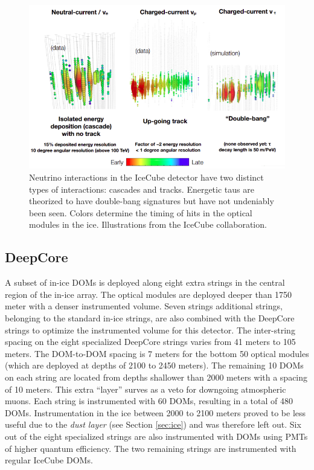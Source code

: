 \begin{figure}
\centering
\includegraphics[width=\textwidth]{chapter4/img/ICinteractions2.png}
\caption{Neutrino interactions in the IceCube detector have two distinct types of interactions: cascades and tracks. Energetic taus are theorized to have double-bang signatures but have not undeniably been seen. Colors determine the timing of hits in the optical modules in the ice. Illustrations from the IceCube collaboration.}
\label{fig:ICinteractions2}
\end{figure}
 
\subsection{DeepCore}
A subset of in-ice DOMs is deployed along eight extra strings in the central region of the in-ice array. The optical modules are deployed deeper than 1750 meter with a denser instrumented volume. Seven strings additional strings, belonging to the standard in-ice strings, are also combined with the DeepCore strings to optimize the instrumented volume for this detector. The inter-string spacing on the eight specialized DeepCore strings varies from 41 meters to 105 meters. The DOM-to-DOM spacing is 7 meters for the bottom 50 optical modules (which are deployed at depths of 2100 to 2450 meters). The remaining 10 DOMs on each string are located from depths shallower than 2000 meters with a spacing of 10 meters. This extra ``layer'' surves as a veto for downgoing atmospheric muons. Each string is instrumented with 60 DOMs, resulting in a total of 480 DOMs. Instrumentation in the ice between 2000 to 2100 meters proved to be less useful due to the \textit{dust layer} (see Section \ref{sec:ice}) and was therefore left out. Six out of the eight specialized strings are also instrumented with DOMs using PMTs of higher quantum efficiency. The two remaining strings are instrumented with regular IceCube DOMs.

